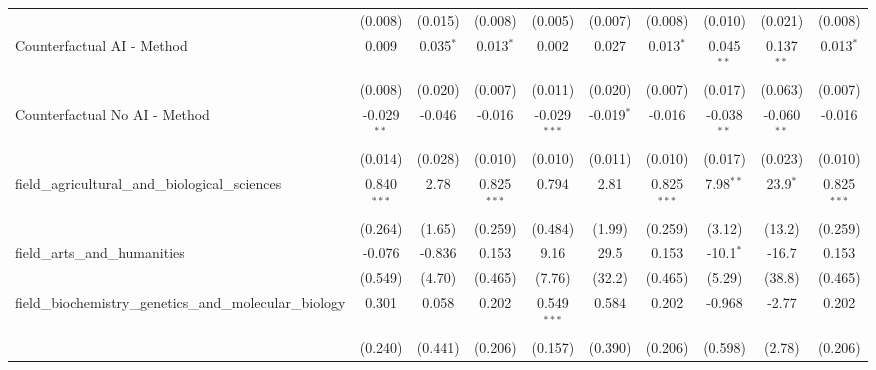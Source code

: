 \begin{tabular}{lccccccccc}
                                                               & (0.008)        & (0.015)        & (0.008)        & (0.005)        & (0.007)       & (0.008)        & (0.010)        & (0.021)        & (0.008)\\   
   Counterfactual AI - Method                                  & 0.009          & 0.035$^{*}$    & 0.013$^{*}$    & 0.002          & 0.027         & 0.013$^{*}$    & 0.045$^{**}$   & 0.137$^{**}$   & 0.013$^{*}$\\   
                                                               & (0.008)        & (0.020)        & (0.007)        & (0.011)        & (0.020)       & (0.007)        & (0.017)        & (0.063)        & (0.007)\\   
   Counterfactual No AI - Method                               & -0.029$^{**}$  & -0.046         & -0.016         & -0.029$^{***}$ & -0.019$^{*}$  & -0.016         & -0.038$^{**}$  & -0.060$^{**}$  & -0.016\\   
                                                               & (0.014)        & (0.028)        & (0.010)        & (0.010)        & (0.011)       & (0.010)        & (0.017)        & (0.023)        & (0.010)\\   
   field\_agricultural\_and\_biological\_sciences              & 0.840$^{***}$  & 2.78           & 0.825$^{***}$  & 0.794          & 2.81          & 0.825$^{***}$  & 7.98$^{**}$    & 23.9$^{*}$     & 0.825$^{***}$\\   
                                                               & (0.264)        & (1.65)         & (0.259)        & (0.484)        & (1.99)        & (0.259)        & (3.12)         & (13.2)         & (0.259)\\   
   field\_arts\_and\_humanities                                & -0.076         & -0.836         & 0.153          & 9.16           & 29.5          & 0.153          & -10.1$^{*}$    & -16.7          & 0.153\\   
                                                               & (0.549)        & (4.70)         & (0.465)        & (7.76)         & (32.2)        & (0.465)        & (5.29)         & (38.8)         & (0.465)\\   
   field\_biochemistry\_genetics\_and\_molecular\_biology      & 0.301          & 0.058          & 0.202          & 0.549$^{***}$  & 0.584         & 0.202          & -0.968         & -2.77          & 0.202\\   
                                                               & (0.240)        & (0.441)        & (0.206)        & (0.157)        & (0.390)       & (0.206)        & (0.598)        & (2.78)         & (0.206)\\   

\end{tabular}
